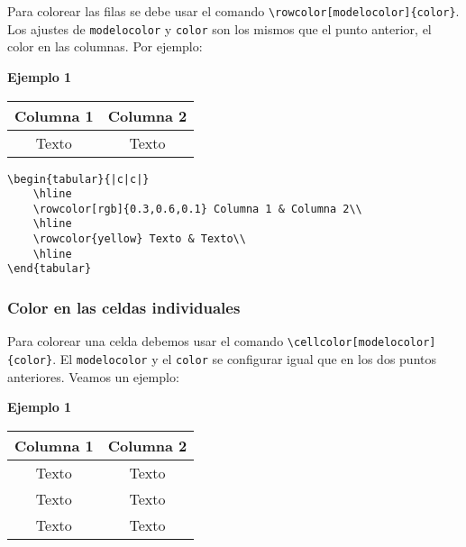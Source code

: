 Para colorear las filas se debe usar el comando \verb|\rowcolor[modelocolor]{color}|. Los ajustes de \verb|modelocolor| y \verb|color| son los mismos que el punto anterior, el color en las columnas. Por ejemplo:

\textbf{Ejemplo 1}

\begin{center}	
	\begin{tabular}{|c|c|}
		\hline
		\rowcolor[rgb]{0.3,0.6,0.1} Columna 1 & Columna 2\\ 	
		\hline
		\rowcolor{yellow} Texto & Texto\\
		\hline
	\end{tabular}
\end{center}

\begin{myquote}
	\begin{lstlisting}
\begin{tabular}{|c|c|}
	\hline
	\rowcolor[rgb]{0.3,0.6,0.1} Columna 1 & Columna 2\\ 	
	\hline
	\rowcolor{yellow} Texto & Texto\\
	\hline
\end{tabular}	
	\end{lstlisting}			
\end{myquote}


\subsubsection{Color en las celdas individuales}

Para colorear una celda debemos usar el comando \verb|\cellcolor[modelocolor]{color}|. El \verb|modelocolor| y el \verb|color| se configurar igual que en los dos puntos anteriores. Veamos un ejemplo:

\textbf{Ejemplo 1}

\begin{center}	
	\begin{tabular}{|c|c|}
		\hline
		\cellcolor[rgb]{0.7,0.2,0.7} Columna 1 & \cellcolor[rgb]{0,0.9,0.3}Columna 2\\ 	
		\hline
		\cellcolor[cmyk]{0,0.2,0.9,0} Texto & \cellcolor[cmyk]{0.9,0.2,0.3,0} Texto\\ 	
		\hline
		\cellcolor[gray]{0.3} Texto & \cellcolor[gray]{0.8} Texto\\ 	
		\hline
		\cellcolor{blue} Texto & \cellcolor{red} Texto\\ 	
		\hline
	\end{tabular}
\end{center}

